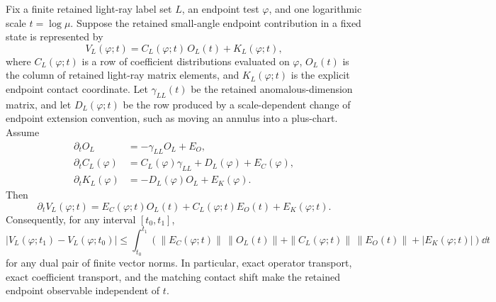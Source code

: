 \begin{proposition}
\label{prop:qcd-eec-finite-endpoint-observable-transport-budget}
Fix a finite retained light-ray label set \(L\), an endpoint test
\(\varphi\), and one logarithmic scale \(t=\log\mu\).  Suppose the retained
small-angle endpoint contribution in a fixed state is represented by
\begin{equation}
  V_L(\varphi;t)
  =
  C_L(\varphi;t)\,O_L(t)
  +
  K_L(\varphi;t),
  \label{eq:qcd-eec-finite-endpoint-observable-chart}
\end{equation}
where \(C_L(\varphi;t)\) is a row of coefficient distributions evaluated on
\(\varphi\), \(O_L(t)\) is the column of retained light-ray matrix elements,
and \(K_L(\varphi;t)\) is the explicit endpoint contact coordinate.  Let
\(\gamma_{LL}(t)\) be the retained anomalous-dimension matrix, and let
\(D_L(\varphi;t)\) be the row produced by a scale-dependent change of
endpoint extension convention, such as moving an annulus into a plus-chart.
Assume
\begin{align}
  \partial_tO_L
  &=
  -\gamma_{LL}O_L+E_O,
  \label{eq:qcd-eec-endpoint-budget-operator}\\
  \partial_tC_L(\varphi)
  &=
  C_L(\varphi)\gamma_{LL}
  +D_L(\varphi)
  +E_C(\varphi),
  \label{eq:qcd-eec-endpoint-budget-coefficient}\\
  \partial_tK_L(\varphi)
  &=
  -D_L(\varphi)O_L+E_K(\varphi).
  \label{eq:qcd-eec-endpoint-budget-contact}
\end{align}
Then
\begin{equation}
  \partial_tV_L(\varphi;t)
  =
  E_C(\varphi;t)O_L(t)
  +
  C_L(\varphi;t)E_O(t)
  +
  E_K(\varphi;t).
  \label{eq:qcd-eec-endpoint-budget-residual}
\end{equation}
Consequently, for any interval \([t_0,t_1]\),
\begin{equation}
  \bigl|V_L(\varphi;t_1)-V_L(\varphi;t_0)\bigr|
  \leq
  \int_{t_0}^{t_1}
  \left(
    \|E_C(\varphi;t)\|\,\|O_L(t)\|
    +
    \|C_L(\varphi;t)\|\,\|E_O(t)\|
    +
    |E_K(\varphi;t)|
  \right)\dd t
  \label{eq:qcd-eec-endpoint-budget-bound}
\end{equation}
for any dual pair of finite vector norms.  In particular, exact operator
transport, exact coefficient transport, and the matching contact shift make
the retained endpoint observable independent of \(t\).
\end{proposition}

